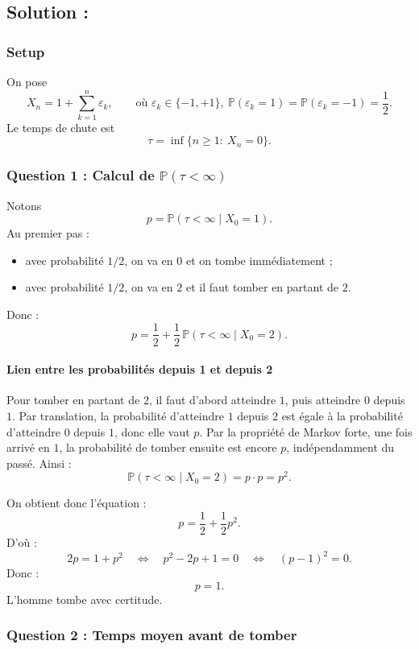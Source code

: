 \subsection*{Solution :}

\subsubsection*{Setup}

On pose
\[
X_n = 1 + \sum_{k=1}^{n}\varepsilon_k,
\qquad \text{où } \varepsilon_k\in\{-1,+1\},\ \mathbb{P}(\varepsilon_k=1)=\mathbb{P}(\varepsilon_k=-1)=\frac12.
\]
Le temps de chute est
\[
\tau=\inf\{n\ge 1:\ X_n=0\}.
\]

\subsubsection*{Question 1 : Calcul de $\mathbb{P}(\tau<\infty)$}

Notons
\[
p=\mathbb{P}(\tau<\infty\mid X_0=1).
\]
Au premier pas :
\begin{itemize}
\item avec probabilité $1/2$, on va en $0$ et on tombe immédiatement ;
\item avec probabilité $1/2$, on va en $2$ et il faut tomber en partant de $2$.
\end{itemize}
Donc :
\[
p=\frac12+\frac12\,\mathbb{P}(\tau<\infty\mid X_0=2).
\]

\paragraph{Lien entre les probabilités depuis 1 et depuis 2}
Pour tomber en partant de $2$, il faut d'abord atteindre $1$, puis atteindre $0$ depuis $1$.
Par translation, la probabilité d'atteindre $1$ depuis $2$ est égale à la probabilité d'atteindre $0$ depuis $1$, donc elle vaut $p$.
Par la propriété de Markov forte, une fois arrivé en $1$, la probabilité de tomber ensuite est encore $p$, indépendamment du passé.
Ainsi :
\[
\mathbb{P}(\tau<\infty\mid X_0=2)=p\cdot p=p^2.
\]

On obtient donc l'équation :
\[
p=\frac12+\frac12 p^2.
\]
D'où :
\[
2p=1+p^2
\quad\Longleftrightarrow\quad
p^2-2p+1=0
\quad\Longleftrightarrow\quad
(p-1)^2=0.
\]
Donc :
\[
\boxed{p=1.}
\]
L'homme tombe avec certitude.

\subsubsection*{Question 2 : Temps moyen avant de tomber}


